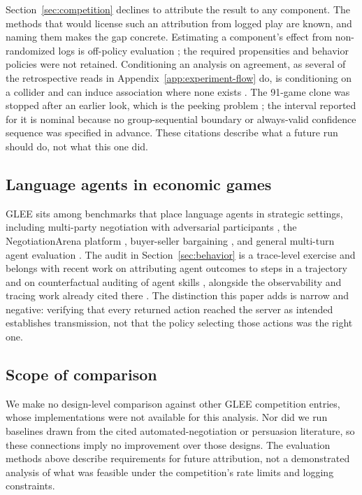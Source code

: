 Section~\ref{sec:competition} declines to attribute the result to any component.
The methods that would license such an attribution from logged play are known,
and naming them makes the gap concrete. Estimating a component's effect from
non-randomized logs is off-policy evaluation
\citep{li2011offline,dudik2014doubly,jiang2016doubly}; the required propensities
and behavior policies were not retained. Conditioning an analysis on agreement,
as several of the retrospective reads in Appendix~\ref{app:experiment-flow} do,
is conditioning on a collider and can induce association where none exists
\citep{elwert2014selection}. The 91-game clone was stopped after an earlier
look, which is the peeking problem \citep{johari2017peeking}; the interval
reported for it is nominal because no group-sequential boundary
\citep{pocock1977group} or always-valid confidence sequence
\citep{howard2021confidence} was specified in advance. These citations describe
what a future run should do, not what this one did.

\subsection{Language agents in economic games}

GLEE \citep{shapira2024glee} sits among benchmarks that place language agents in
strategic settings, including multi-party negotiation with adversarial
participants \citep{abdelnabi2023negotiation}, the NegotiationArena platform
\citep{bianchi2024arena}, buyer-seller bargaining
\citep{xia2024bargaining}, and general multi-turn agent evaluation
\citep{ma2024agentboard}. The audit in Section~\ref{sec:behavior} is a
trace-level exercise and belongs with recent work on attributing agent outcomes
to steps in a trajectory \citep{chen2026trajectory} and on counterfactual
auditing of agent skills \citep{zhou2026cta}, alongside the observability and
tracing work already cited there
\citep{seyedghorban2026observability,zhang2025agentracer}. The distinction this
paper adds is narrow and negative: verifying that every returned action reached
the server as intended establishes transmission, not that the policy selecting
those actions was the right one.

\subsection{Scope of comparison}

We make no design-level comparison against other GLEE competition entries,
whose implementations were not available for this analysis. Nor did we run
baselines drawn from the cited automated-negotiation or persuasion literature,
so these connections imply no improvement over those designs. The evaluation
methods above describe requirements for future attribution, not a demonstrated
analysis of what was feasible under the competition's rate limits and logging
constraints.

